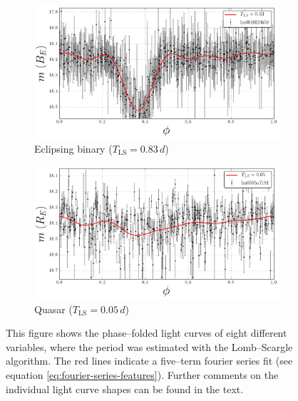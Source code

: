 \begin{figure}[H]
\begin{subfigure}[t]{0.49\textwidth}
	\end{subfigure}
	\begin{subfigure}[t]{0.49\textwidth}
		\centering
		\caption{Eclipsing binary ($T_{\text{LS}} = 0.83 \, \unit{d}$)}
		\label{fig:lightcurve-eb}
		\includegraphics[width=\textwidth]{figures/lightcurves/eb.png}		
	\end{subfigure}
	\begin{subfigure}[t]{0.49\textwidth}
		\centering
		\caption{Quasar ($T_{\text{LS}} = 0.05 \, \unit{d}$)}
		\label{fig:lightcurve-qso}
		\includegraphics[width=\textwidth]{figures/lightcurves/qso.png}		
	\end{subfigure}
	\caption[Light curves for different variable sources]{This figure shows the phase--folded light curves of eight different variables, where the period was estimated with the Lomb--Scargle algorithm. The red lines indicate a five--term fourier series fit (see equation \eqref{eq:fourier-series-features}). Further comments on the individual light curve shapes can be found in the text.}
	\label{fig:various-light-curves}
\end{figure}

